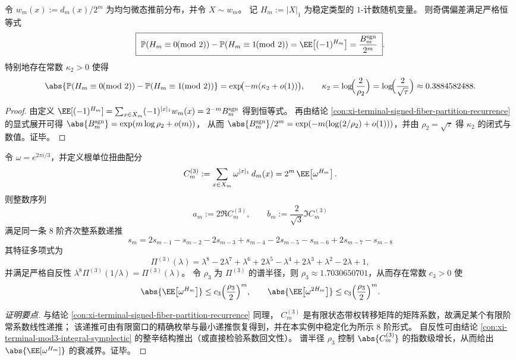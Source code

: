 \begin{conclusion}[奇偶偏差的指数衰减：\texorpdfstring{$\kappa_2=\log(2/\sqrt{\tau})$}{kappa2=log(2/sqrt(tau))}]\label{con:xi-terminal-parity-gap-kappa2}
令 \(w_m(x):=d_m(x)/2^m\) 为均匀微态推前分布，并令 \(X\sim w_m\)。
记 \(H_m:=|X|_1\) 为稳定类型的 \(1\)-计数随机变量。
则奇偶偏差满足严格恒等式
\[
\boxed{\;
\mathbb P(H_m\equiv 0\!\!\!\pmod 2)-\mathbb P(H_m\equiv 1\!\!\!\pmod 2)
=\EE\bigl[(-1)^{H_m}\bigr]
=\frac{B_m^{\mathrm{sgn}}}{2^m}\; }.
\]
特别地存在常数 \(\kappa_2>0\) 使得
\[
\abs{\mathbb P(H_m\equiv 0\!\!\!\pmod 2)-\mathbb P(H_m\equiv 1\!\!\!\pmod 2)}
=\exp\!\bigl(-m(\kappa_2+o(1))\bigr),
\qquad
\kappa_2=\log\!\Bigl(\frac{2}{\rho_2}\Bigr)=\log\!\Bigl(\frac{2}{\sqrt{\tau}}\Bigr)\approx 0.3884582488.
\]
\end{conclusion}
\begin{proof}
由定义
\(
\EE[(-1)^{H_m}]=\sum_{x\in X_m}(-1)^{|x|_1}w_m(x)=2^{-m}B_m^{\mathrm{sgn}}
\)
得到恒等式。
再由结论 \ref{con:xi-terminal-signed-fiber-partition-recurrence} 的显式展开可得
\(
\abs{B_m^{\mathrm{sgn}}}=\exp(m\log\rho_2+o(m))
\)，
从而
\(
\abs{B_m^{\mathrm{sgn}}}/2^m=\exp(-m(\log(2/\rho_2)+o(1)))
\)，并由 \(\rho_2=\sqrt{\tau}\) 得 \(\kappa_2\) 的闭式与数值。证毕。
\end{proof}

\begin{conclusion}\label{con:xi-terminal-mod3-fourier-order8-recurrence}
令 \(\omega=e^{2\pi i/3}\)，并定义根单位扭曲配分
\[
C_m^{(3)}:=\sum_{x\in X_m}\omega^{|x|_1}\,d_m(x)
=2^m\,\EE\!\left[\omega^{H_m}\right].
\]
则整数序列
\[
a_m:=2\Re C_m^{(3)},\qquad b_m:=\frac{2}{\sqrt3}\Im C_m^{(3)}
\]
满足同一条 \(8\) 阶齐次整系数递推
\[
\boxed{\;
s_m
=2s_{m-1}-s_{m-2}-2s_{m-3}+s_{m-4}-2s_{m-5}-s_{m-6}+2s_{m-7}-s_{m-8}\;}
\]
其特征多项式为
\[
\Pi^{(3)}(\lambda)=\lambda^8-2\lambda^7+\lambda^6+2\lambda^5-\lambda^4+2\lambda^3+\lambda^2-2\lambda+1,
\]
并满足严格自反性 \(\lambda^8\Pi^{(3)}(1/\lambda)=\Pi^{(3)}(\lambda)\)。
令 \(\rho_3\) 为 \(\Pi^{(3)}\) 的谱半径，则 \(\rho_3\approx 1.7030650701\)，从而存在常数 \(c_3>0\) 使
\[
\abs{\EE\!\left[\omega^{H_m}\right]}\le c_3\Bigl(\frac{\rho_3}{2}\Bigr)^m,
\qquad
\abs{\EE\!\left[\omega^{2H_m}\right]}\le c_3\Bigl(\frac{\rho_3}{2}\Bigr)^m.
\]
\end{conclusion}
\begin{proof}[证明要点]
与结论 \ref{con:xi-terminal-signed-fiber-partition-recurrence} 同理，
\(C_m^{(3)}\) 是有限状态带权转移矩阵的矩阵系数，故满足某个有限阶常系数线性递推；
该递推可由有限窗口的精确枚举与最小递推恢复得到，并在本实例中稳定化为所示 \(8\) 阶形式。
自反性可由结论 \ref{con:xi-terminal-mod3-integral-symplectic} 的整辛结构推出（或直接检验系数回文性）。
谱半径 \(\rho_3\) 控制 \(\abs{C_m^{(3)}}\) 的指数级增长，从而给出 \(\abs{\EE[\omega^{H_m}]}\) 的衰减界。证毕。
\end{proof}

